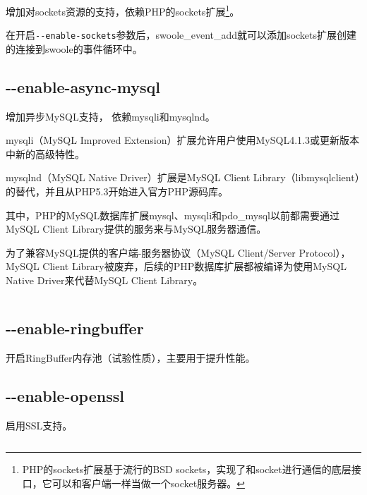 增加对sockets资源的支持，依赖PHP的sockets扩展\footnote{PHP的sockets扩展基于流行的BSD sockets，实现了和socket进行通信的底层接口，它可以和客户端一样当做一个socket服务器。}。

在开启\texttt{-\/-enable-sockets}参数后，swoole\_event\_add就可以添加sockets扩展创建的连接到swoole的事件循环中。

\subsection{-\/-enable-async-mysql}


增加异步MySQL支持， 依赖mysqli和mysqlnd。

\begin{compactitem}
\item mysqli（MySQL Improved Extension）扩展允许用户使用MySQL4.1.3或更新版本中新的高级特性。
\item mysqlnd（MySQL Native Driver）扩展是MySQL Client Library（libmysqlclient）的替代，并且从PHP5.3开始进入官方PHP源码库。
\end{compactitem}

其中，PHP的MySQL数据库扩展mysql、mysqli和pdo\_mysql以前都需要通过MySQL Client Library提供的服务来与MySQL服务器通信。

为了兼容MySQL提供的客户端-服务器协议（MySQL Client/Server Protocol），MySQL Client Library被废弃，后续的PHP数据库扩展都被编译为使用MySQL Native Driver来代替MySQL Client Library。

\begin{lstlisting}[language=bash]

\end{lstlisting}

\subsection{-\/-enable-ringbuffer}

开启RingBuffer内存池（试验性质），主要用于提升性能。

\subsection{-\/-enable-openssl}

启用SSL支持。

\begin{lstlisting}[language=bash]

\end{lstlisting}



